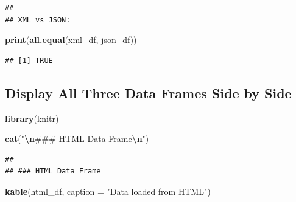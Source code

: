 \documentclass[
]{article}
\newenvironment{Shaded}{\begin{snugshade}}{\end{snugshade}}
\newcommand{\AttributeTok}[1]{\textcolor[rgb]{0.13,0.29,0.53}{#1}}
\newcommand{\FunctionTok}[1]{\textcolor[rgb]{0.13,0.29,0.53}{\textbf{#1}}}
\newcommand{\NormalTok}[1]{#1}
\newcommand{\SpecialCharTok}[1]{\textcolor[rgb]{0.81,0.36,0.00}{\textbf{#1}}}
\newcommand{\StringTok}[1]{\textcolor[rgb]{0.31,0.60,0.02}{#1}}
\begin{document}
\begin{verbatim}
## 
## XML vs JSON:
\end{verbatim}

\begin{Shaded}
\begin{Highlighting}[]
\FunctionTok{print}\NormalTok{(}\FunctionTok{all.equal}\NormalTok{(xml\_df, json\_df))}
\end{Highlighting}
\end{Shaded}

\begin{verbatim}
## [1] TRUE
\end{verbatim}

\subsection{Display All Three Data Frames Side by
Side}\label{display-all-three-data-frames-side-by-side}

\begin{Shaded}
\begin{Highlighting}[]
\FunctionTok{library}\NormalTok{(knitr)}

\FunctionTok{cat}\NormalTok{(}\StringTok{"}\SpecialCharTok{\textbackslash{}n}\StringTok{\#\#\# HTML Data Frame}\SpecialCharTok{\textbackslash{}n}\StringTok{"}\NormalTok{)}
\end{Highlighting}
\end{Shaded}

\begin{verbatim}
## 
## ### HTML Data Frame
\end{verbatim}

\begin{Shaded}
\begin{Highlighting}[]
\FunctionTok{kable}\NormalTok{(html\_df, }\AttributeTok{caption =} \StringTok{"Data loaded from HTML"}\NormalTok{)}
\end{Highlighting}
\end{Shaded}
\end{document}
